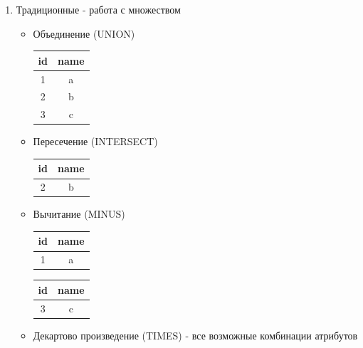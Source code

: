 \documentclass[a4paper, 14pt]{report}
\begin{document}
\begin{enumerate}
    \item Традиционные - работа с множеством

        \begin{itemize}
            \item Объединение (UNION)

                \begin{tabular}{|c|c|}
                    \hline
                    id & name \\
                    \hline
                    1 & a \\
                    \hline
                    2 & b \\
                    \hline
                    3 & c \\
                    \hline
                \end{tabular}

            \item Пересечение (INTERSECT)

                \begin{tabular}{|c|c|}
                    \hline
                    id & name \\
                    \hline
                    2 & b \\
                    \hline
                \end{tabular}

            \item Вычитание (MINUS)

                \begin{tabular}{|c|c|}
                    \hline
                    id & name \\
                    \hline
                    1 & a \\
                    \hline
                \end{tabular}

                \begin{tabular}{|c|c|}
                    \hline
                    id & name \\
                    \hline
                    3 & c \\
                    \hline
                \end{tabular}

            \item Декартово произведение (TIMES) - все возможные комбинации атрибутов
        \end{itemize}


\end{enumerate}
\end{document}
